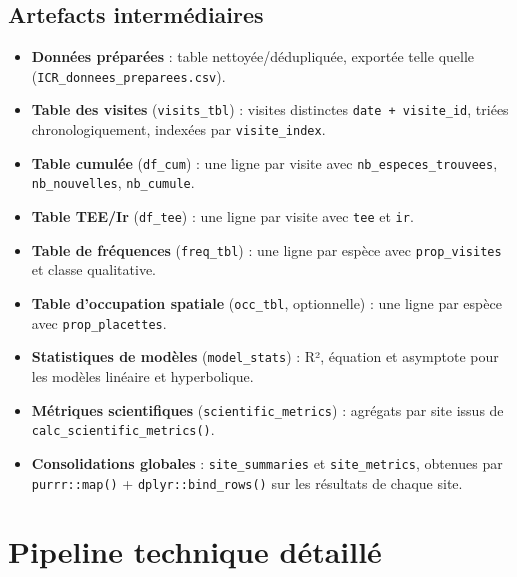\documentclass[11pt,a4paper]{article}
\begin{document}
\subsection{Artefacts intermédiaires}
\begin{itemize}[leftmargin=1.2cm]
  \item \textbf{Données préparées} : table nettoyée/dédupliquée, exportée telle quelle (\texttt{ICR\_donnees\_preparees.csv}).
  \item \textbf{Table des visites} (\texttt{visits\_tbl}) : visites distinctes \texttt{date + visite\_id}, triées chronologiquement, indexées par \texttt{visite\_index}.
  \item \textbf{Table cumulée} (\texttt{df\_cum}) : une ligne par visite avec \texttt{nb\_especes\_trouvees}, \texttt{nb\_nouvelles}, \texttt{nb\_cumule}.
  \item \textbf{Table TEE/Ir} (\texttt{df\_tee}) : une ligne par visite avec \texttt{tee} et \texttt{ir}.
  \item \textbf{Table de fréquences} (\texttt{freq\_tbl}) : une ligne par espèce avec \texttt{prop\_visites} et classe qualitative.
  \item \textbf{Table d'occupation spatiale} (\texttt{occ\_tbl}, optionnelle) : une ligne par espèce avec \texttt{prop\_placettes}.
  \item \textbf{Statistiques de modèles} (\texttt{model\_stats}) : R², équation et asymptote pour les modèles linéaire et hyperbolique.
  \item \textbf{Métriques scientifiques} (\texttt{scientific\_metrics}) : agrégats par site issus de \texttt{calc\_scientific\_metrics()}.
  \item \textbf{Consolidations globales} : \texttt{site\_summaries} et \texttt{site\_metrics}, obtenues par \texttt{purrr::map()} + \texttt{dplyr::bind\_rows()} sur les résultats de chaque site.
\end{itemize}

\section{Pipeline technique détaillé}
\label{sec:pipeline}
\end{document}

